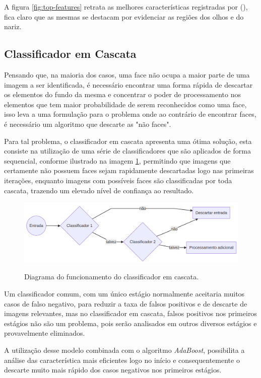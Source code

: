  A figura \ref{fig:top-features} retrata as melhores características registradas por  (\citeyear{paper-viola-jones}), fica claro que as mesmas se destacam por evidenciar as regiões dos olhos e do nariz.

\subsection{Classificador em Cascata}

Pensando que, na maioria dos casos, uma face não ocupa a maior parte de uma imagem a ser identificada, é necessário encontrar uma forma rápida de descartar os elementos do fundo da mesma e concentrar o poder de processamento nos elementos que tem maior probabilidade de serem reconhecidos como uma face, isso leva a uma formulação para o problema onde ao contrário de encontrar faces, é necessário um algoritmo que descarte as "não faces".

Para tal problema, o classificador em cascata apresenta uma ótima solução, esta consiste na utilização de uma série de classificadores que são aplicados de forma sequencial, conforme ilustrado na imagem \ref{fig:cascade-classifier}, permitindo que imagens que certamente não possuem faces sejam rapidamente descartadas logo nas primeiras iterações, enquanto imagens com possíveis faces são classificadas por toda cascata, trazendo um elevado nível de confiança ao resultado.

\begin{figure}[htb]
    \centering
    \caption{Diagrama do funcionamento do classificador em cascata.}
    \includegraphics[scale=.2]{figs/cascade-classifier.png}
    \label{fig:cascade-classifier}
 \end{figure}

 Um classificador comum, com um único estágio normalmente aceitaria muitos casos de falso negativo, para reduzir a taxa de falsos positivos e de descarte de imagens relevantes, mas no classificador em cascata, falsos positivos nos primeiros estágios não são um problema, pois serão analisados em outros diversos estágios e provavelmente eliminados.

 A utilização desse modelo combinada com o algoritmo \textit{AdaBoost}, possibilita a análise das característica mais eficientes logo no início e consequentemente o descarte muito mais rápido dos casos negativos nos primeiros estágios.
